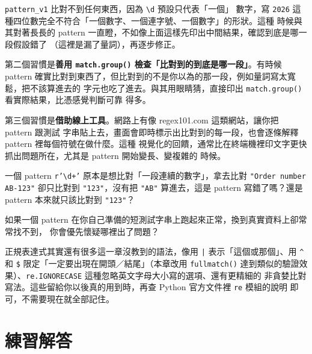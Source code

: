 \texttt{pattern\_v1} 比對不到任何東西，因為 \texttt{\textbackslash d} 預設只代表「一個」
數字，寫 \texttt{2026} 這種四位數完全不符合「一個數字、一個連字號、一個數字」的形狀。這種
時候與其對著長長的 pattern 一直瞪，不如像上面這樣先印出中間結果，確認到底是哪一段假設錯了
（這裡是漏了量詞），再逐步修正。

第二個習慣是\textbf{善用 \texttt{match.group()} 檢查「比對到的到底是哪一段」}。有時候
pattern 確實比對到東西了，但比對到的不是你以為的那一段，例如量詞寫太寬鬆，把不該算進去的
字元也吃了進去。與其用眼睛猜，直接印出 \texttt{match.group()} 看實際結果，比憑感覺判斷可靠
得多。

第三個習慣是\textbf{借助線上工具}。網路上有像 regex101.com 這類網站，讓你把 pattern 跟測試
字串貼上去，畫面會即時標示出比對到的每一段，也會逐條解釋 pattern 裡每個符號在做什麼。這種
視覺化的回饋，通常比在終端機裡印文字更快抓出問題所在，尤其是 pattern 開始變長、變複雜的
時候。


\begin{drills}[label=drills:regex-debug]
\item 一個 pattern \texttt{r'\textbackslash d+'} 原本是想比對「一段連續的數字」，拿去比對
\texttt{"Order number AB-123"} 卻只比對到 \texttt{"123"}，沒有把 \texttt{"AB"} 算進去，這是
pattern 寫錯了嗎？還是 pattern 本來就只該比對到 \texttt{"123"}？
\item 如果一個 pattern 在你自己準備的短測試字串上跑起來正常，換到真實資料上卻常常找不到，
你會優先懷疑哪裡出了問題？
\end{drills}

正規表達式其實還有很多這一章沒教到的語法，像用 \texttt{|} 表示「這個或那個」、用
\texttt{\^{}} 和 \texttt{\$} 限定「一定要出現在開頭／結尾」（本章改用 \texttt{fullmatch()}
達到類似的驗證效果）、\texttt{re.IGNORECASE} 這種忽略英文字母大小寫的選項、還有更精細的
非貪婪比對寫法。這些留給你以後真的用到時，再查 Python 官方文件裡 \texttt{re} 模組的說明
即可，不需要現在就全部記住。

\section*{練習解答}

